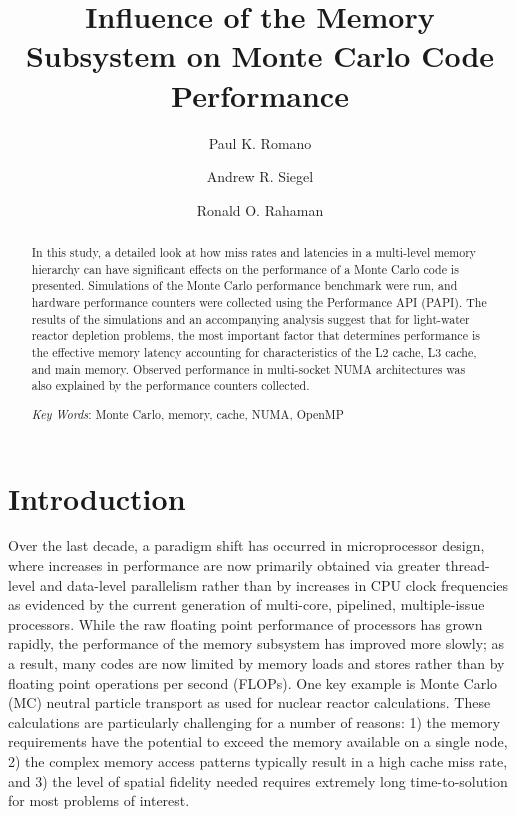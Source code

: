 \documentclass{mc2015}
\begin{document}
\title{Influence of the Memory Subsystem on Monte Carlo Code Performance}

\author{Paul K. Romano}

\author{Andrew R. Siegel}
\author{Ronald O. Rahaman}

\maketitle

\begin{abstract}
In this study, a detailed look at how miss rates and latencies in a multi-level
memory hierarchy can have significant effects on the performance of a Monte
Carlo code is presented. Simulations of the Monte Carlo performance benchmark
were run, and hardware performance counters were collected using the
Performance API (PAPI). The results of the simulations and an accompanying
analysis suggest that for light-water reactor depletion problems, the most
important factor that determines performance is the effective memory latency
accounting for characteristics of the L2 cache, L3 cache, and main
memory. Observed performance in multi-socket NUMA architectures was also
explained by the performance counters collected.

\emph{Key Words}: Monte Carlo, memory, cache, NUMA, OpenMP
\end{abstract}

\section{Introduction}

Over the last decade, a paradigm shift has occurred in microprocessor design,
where increases in performance are now primarily obtained via greater
thread-level and data-level parallelism rather than by increases in CPU clock
frequencies as evidenced by the current generation of multi-core, pipelined,
multiple-issue processors. While the raw floating point performance of
processors has grown rapidly, the performance of the memory subsystem has
improved more slowly; as a result, many codes are now limited by memory loads
and stores rather than by floating point operations per second (FLOPs). One key
example is Monte Carlo (MC) neutral particle transport as used for nuclear
reactor calculations. These calculations are particularly challenging for a
number of reasons: 1) the memory requirements have the potential to exceed the
memory available on a single node, 2) the complex memory access patterns
typically result in a high cache miss rate, and 3) the level of spatial fidelity
needed requires extremely long time-to-solution for most problems of interest.
\end{document}
